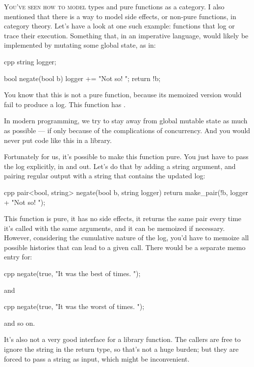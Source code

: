 
\lettrine[lhang=0.17]{Y}{ou've seen how to model} types and pure functions as a category. I also
mentioned that there is a way to model side effects, or non-pure
functions, in category theory. Let's have a look at one such example:
functions that log or trace their execution. Something that, in an
imperative language, would likely be implemented by mutating some global
state, as in:

\begin{snip}{cpp}
string logger;

bool negate(bool b) {
    logger += "Not so! ";
    return !b;
}
\end{snip}
You know that this is not a pure function, because its memoized version
would fail to produce a log. This function has .

In modern programming, we try to stay away from global mutable state as
much as possible --- if only because of the complications of
concurrency. And you would never put code like this in a library.

Fortunately for us, it's possible to make this function pure. You just
have to pass the log explicitly, in and out. Let's do that by adding a
string argument, and pairing regular output with a string that contains
the updated log:

\begin{snip}{cpp}
pair<bool, string> negate(bool b, string logger) {
    return make_pair(!b, logger + "Not so! ");
}
\end{snip}
This function is pure, it has no side effects, it returns the same pair
every time it's called with the same arguments, and it can be memoized
if necessary. However, considering the cumulative nature of the log,
you'd have to memoize all possible histories that can lead to a given
call. There would be a separate memo entry for:

\begin{snip}{cpp}
negate(true, "It was the best of times. ");
\end{snip}
and

\begin{snip}{cpp}
negate(true, "It was the worst of times. ");
\end{snip}
and so on.

It's also not a very good interface for a library function. The callers
are free to ignore the string in the return type, so that's not a huge
burden; but they are forced to pass a string as input, which might be
inconvenient.

